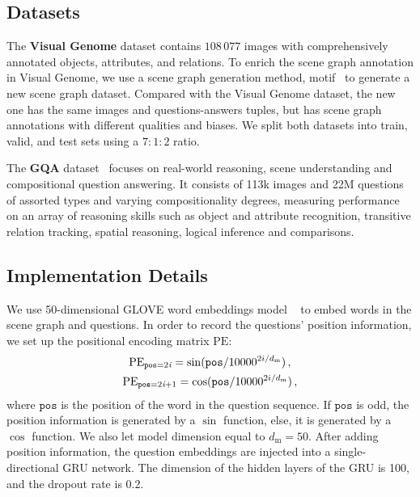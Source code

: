 \documentclass[letterpaper]{article} %
\begin{document}
\subsection{Datasets}

\quad The \textbf{Visual Genome} dataset contains $108 \, 077$ images with comprehensively annotated objects, attributes, and relations. To enrich the scene graph annotation in Visual Genome, we use a scene graph generation method, motif~\cite{DBLP:conf/cvpr/ZellersYTC18} to generate a new scene graph dataset. 
Compared with the Visual Genome dataset, the new one has the same images and questions-answers tuples, but has scene graph annotations with different qualities and biases. 
We split both datasets into train, valid, and test sets using a $7:1:2$ ratio. 

\quad The \textbf{GQA} dataset~\cite{DBLP:conf/cvpr/HudsonM19} focuses on real-world reasoning, scene understanding and compositional question answering. It consists of 113k images and 22M questions of assorted types and varying compositionality degrees, measuring performance on an array of reasoning skills such as object and attribute recognition, transitive relation tracking, spatial reasoning, logical inference and comparisons.



\subsection{Implementation Details}

We use 50-dimensional GLOVE word embeddings model ~\cite{pennington-etal-2014-glove} to embed words in the scene graph and questions. In order to record the questions' position information, we set up the positional encoding matrix $\textrm{PE}$:
\begin{gather}\notag
    \textrm{PE}_{\texttt{pos}=2\emph{i}} = \sin(\texttt{pos}/10000^{2i/d_{\textrm{m}}}) \, ,\\
    \textrm{PE}_{\texttt{pos}=2\emph{i}+1} = \cos(\texttt{pos}/10000^{2i/d_{\textrm{m}}}) \, , \notag
\end{gather}
where $\texttt{pos}$ is the position of the word in the question sequence. 
If $\texttt{pos}$ is odd, the position information is generated by a $\sin$ function, else, it is generated by a $\cos$ function. 
We also let model dimension equal to $d_{\textrm{m}}=50$.
After adding position information, the question embeddings are injected into a single-directional GRU network. 
The dimension of the hidden layers of the GRU is 100, and the dropout rate is 0.2.
\end{document}
